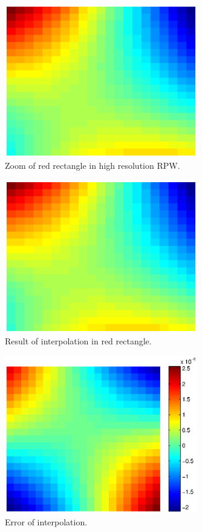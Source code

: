 \documentclass{article}
\begin{document}
\begin{figure}[h]
  \begin{center}
    \includegraphics[width=0.75\textwidth]{figures/interpolation/high_res_trouble_spot_12_7.eps}
    \caption{Zoom of red rectangle in high resolution RPW.}
  \end{center}
\end{figure}

\begin{figure}[h]
  \begin{center}
    \includegraphics[width=0.75\textwidth]{figures/interpolation/interpolated_trouble_spot_12_7.eps}
    \caption{Result of interpolation in red rectangle.}
  \end{center}
\end{figure}

\begin{figure}[h]
  \begin{center}
    \includegraphics[width=0.75\textwidth]{figures/interpolation/error.eps}
    \caption{Error of interpolation.}
  \end{center}
\end{figure}
\end{document}
